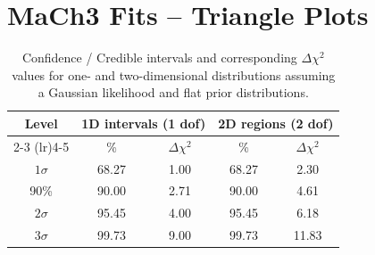 \section{MaCh3 Fits – Triangle Plots}
%
\begin{table}[htbp]
\centering
\caption{Confidence / Credible intervals and corresponding $\Delta\chi^2$ values for one- and two-dimensional distributions assuming a Gaussian likelihood and flat prior distributions.}
\begin{tabular}{c cc cc}
\toprule
\multirow{2}{*}{Level} & \multicolumn{2}{c}{1D intervals (1 dof)} & \multicolumn{2}{c}{2D regions (2 dof)} \\
\cmidrule(lr){2-3} \cmidrule(lr){4-5}
& \% & $\Delta\chi^2$ & \% & $\Delta\chi^2$ \\
\midrule
$1\sigma$ & 68.27 & 1.00  & 68.27 & 2.30 \\
90\%      & 90.00 & 2.71  & 90.00 & 4.61 \\
$2\sigma$ & 95.45 & 4.00  & 95.45 & 6.18 \\
$3\sigma$ & 99.73 & 9.00  & 99.73 & 11.83 \\
\bottomrule
\end{tabular}
\end{table}
%

